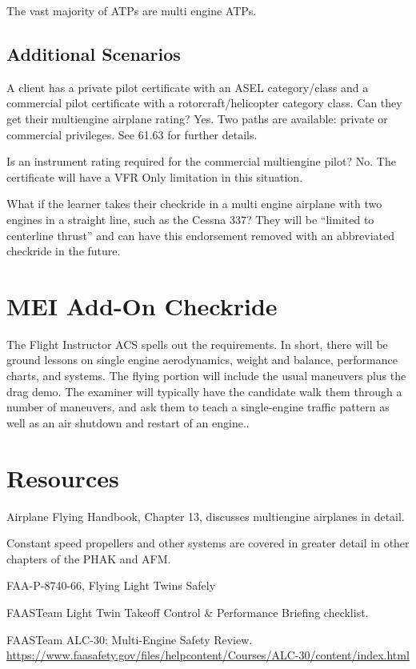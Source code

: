 The vast majority of ATPs are multi engine ATPs.

\subsection{Additional Scenarios}

A client has a private pilot certificate with an ASEL category/class and a commercial pilot
certificate with a rotorcraft/helicopter category class. Can they get their multiengine airplane
rating? Yes. Two paths are available: private or commercial privileges. See 61.63
for further details.

Is an instrument rating required for the commercial multiengine pilot? No. The certificate will have
a VFR Only limitation in this situation.

What if the learner takes their checkride in a multi engine airplane with two engines in a straight line, such as the Cessna 337?
They will be ``limited to centerline thrust'' and
can have this endorsement removed with an abbreviated checkride in the future.

\section{MEI Add-On Checkride}

The Flight Instructor ACS spells out the requirements. In short, there will be ground lessons on
single engine aerodynamics, weight and balance, performance charts, and systems. The flying
portion will include the usual maneuvers plus the drag demo. The examiner will typically have the
candidate walk them through a number of maneuvers, and ask them to teach a single-engine
traffic pattern as well as an air shutdown and restart of an engine..

\section{Resources}

Airplane Flying Handbook, Chapter 13, discusses multiengine airplanes in detail.

Constant speed propellers and other systems are covered in greater detail in other chapters of the PHAK and AFM.

FAA-P-8740-66, Flying Light Twins Safely

FAASTeam Light Twin Takeoff Control \& Performance Briefing checklist.

FAASTeam ALC-30: Multi-Engine Safety Review.\\\url{https://www.faasafety.gov/files/helpcontent/Courses/ALC-30/content/index.html}


